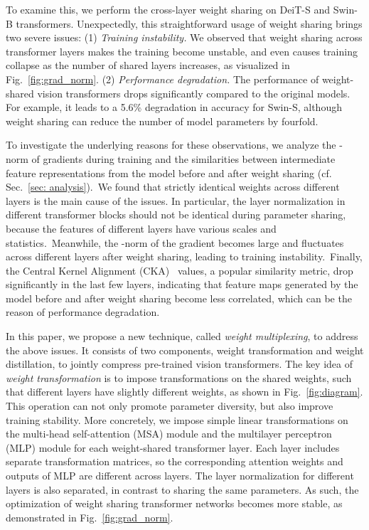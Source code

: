 \documentclass[10pt,twocolumn,letterpaper]{article}
\begin{document}
To examine this, we perform the cross-layer weight sharing \cite{Albert} on DeiT-S \cite{deit} and Swin-B \cite{deit} transformers. Unexpectedly, this straightforward usage of weight sharing brings two severe issues: (1) \emph{Training instability.} We observed that weight sharing across transformer layers makes the training become unstable, and even causes training collapse as the number of shared layers increases, as visualized in Fig.~\ref{fig:grad_norm}. (2) \emph{Performance degradation.} The performance of weight-shared vision transformers drops significantly compared to the original models. For example, it leads to a 5.6\% degradation in accuracy for Swin-S, although weight sharing can reduce the number of model parameters by fourfold.

To investigate the underlying reasons for these observations, we analyze the -norm of gradients during training and the similarities between intermediate feature representations from the model before and after weight sharing (cf. Sec.~\ref{sec: analysis}).~We found that strictly identical weights across different layers is the main cause of the issues. In particular, the layer normalization \cite{LN} in different transformer blocks should not be identical during parameter sharing, because the features of different layers have various scales and statistics.~Meanwhile, the -norm of the gradient becomes large and fluctuates across different layers after weight sharing, leading to training instability.~Finally, the Central Kernel Alignment (CKA)~\cite{cka} values, a popular similarity metric, drop significantly in the last few layers, indicating that feature maps generated by the model before and after weight sharing become less correlated, which can be the reason of performance degradation.


In this paper, we propose a new technique, called \emph{weight multiplexing}, to address the above issues. It consists of two components, weight transformation and weight distillation, to jointly compress pre-trained vision transformers. 
The key idea of \emph{weight transformation} is to impose transformations on the shared weights, such that different layers have slightly different weights, as shown in Fig.~\ref{fig:diagram}.
This operation can not only promote parameter diversity, but also improve training stability. More concretely, we impose simple linear transformations on the multi-head self-attention (MSA) module and the multilayer perceptron (MLP) module for each weight-shared transformer layer. Each layer includes separate transformation matrices, so the corresponding attention weights and outputs of MLP are different across layers. The layer normalization for different layers is also separated, in contrast to sharing the same parameters. As such, the optimization of weight sharing transformer networks becomes more stable, as demonstrated in Fig.~\ref{fig:grad_norm}.
\end{document}
